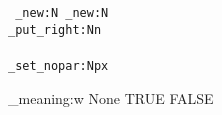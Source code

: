 \documentclass{article}
\begin{document}
\ExplSyntaxOn
\tt
\tl_new:N \test
\meaning\tl_new:N \\
\tl_put_right:Nn \\

\meaning\test\\

\cs_set_nopar:Npx 
\def\tempa{None}

\if_meaning:w \test\tempa
TRUE
\else
\expandafter FALSE
\fi

\ExplSyntaxOff
\end{document}
